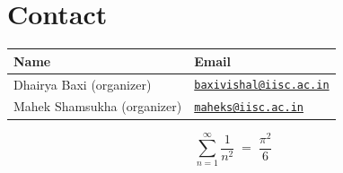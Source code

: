 \documentclass[12pt]{article}
\theoremstyle{definition}
\theoremstyle{remark}
\begin{document}
\section{Contact}
\label{sec:contact}

\begin{center}
\begin{tabular}{ll}
\hline
\textbf{Name} & \textbf{Email} \\
\hline
Dhairya Baxi (organizer) &
  \href{mailto:baxivishal@iisc.ac.in}{\texttt{baxivishal@iisc.ac.in}} \\
Mahek Shamsukha (organizer) &
  \href{mailto:maheks@iisc.ac.in}{\texttt{maheks@iisc.ac.in}} \\
\hline
\end{tabular}
\end{center}

\[
  \sum_{n=1}^{\infty}\frac{1}{n^2} \;=\; \frac{\pi^2}{6}
\]
\end{document}
